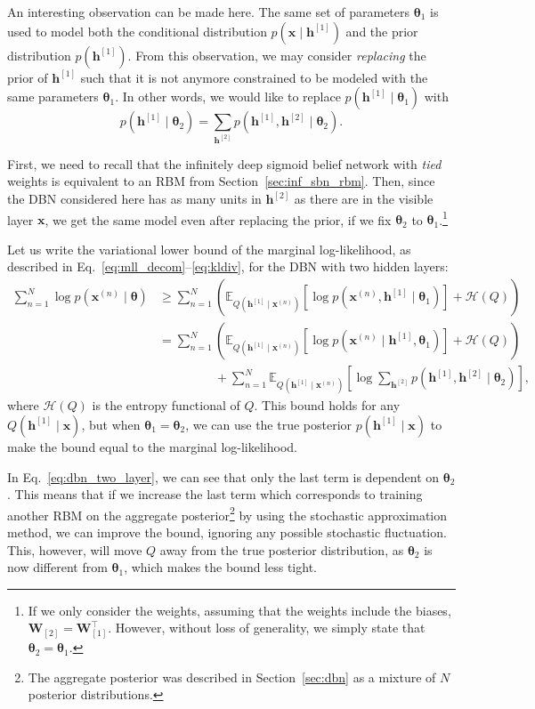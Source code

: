 \documentclass{now}
\newcommand{\qlay}[1]{\left[#1\right]}
\newcommand{\vect}[1]{\mathbf{#1}}
\newcommand{\vects}[1]{\boldsymbol{#1}}
\newcommand{\matr}[1]{\mathbf{#1}}
\newcommand{\vh}[0]{\vect{h}}
\newcommand{\vx}[0]{\vect{x}}
\newcommand{\mW}[0]{\matr{W}}
\newcommand{\TT}[0]{{\vects{\theta}}}
\newcommand{\HH}[0]{\mathcal{H}}
\newcommand{\E}[0]{\mathbb{E}}
\begin{document}
An interesting observation can be made here.  The same set
of parameters $\TT_1$ is used to model both the
conditional distribution $p(\vx \mid \vh^{\qlay{1}})$ and the
prior distribution $p(\vh^{\qlay{1}})$. From this observation, 
we may consider \textit{replacing} the prior of
$\vh^{\qlay{1}}$ such that it is not anymore constrained to be
modeled with the same parameters $\TT_1$.
In other words, we would like to replace
$p(\vh^{\qlay{1}} \mid \TT_1)$ with
\[
p(\vh^{\qlay{1}} \mid \TT_2) = \sum_{\vh^{\qlay{2}}}
p(\vh^{\qlay{1}},
\vh^{\qlay{2}} \mid \TT_2).
\]

First, we need to recall that the infinitely deep sigmoid
belief network with \textit{tied} weights is equivalent to
an RBM from Section~\ref{sec:inf_sbn_rbm}. Then, since the DBN
considered here has as many units in $\vh^{\qlay{2}}$ as there
are in the visible layer $\vx$, we get the same model even
after replacing the prior, if we fix $\TT_2$ to
$\TT_1$.\footnote{ If we only consider the weights, assuming
that the weights include the biases,
$\mW_{\qlay{2}}=\mW_{\qlay{1}}^\top$.
However, without loss of generality, we simply state that
$\TT_2=\TT_1$.  }

Let us write the variational lower bound of the marginal
log-likelihood, as described in
Eq.~\eqref{eq:mll_decom}--\eqref{eq:kldiv}, for the DBN with
two hidden layers:
\begin{align}
    \label{eq:dbn_two_layer}
    \sum_{n=1}^N \log p(\vx^{(n)} \mid \TT) &\geq
    \sum_{n=1}^N \left(\E_{Q(\vh^{\qlay{1}} \mid \vx^{(n)})} \left[
    \log p(\vx^{(n)}, \vh^{\qlay{1}} \mid \TT_1)
    \right] + \HH(Q)\right) 
    \nonumber \\
    &= \sum_{n=1}^N \left(\E_{Q(\vh^{\qlay{1}} \mid \vx^{(n)})} \left[
    \log p(\vx^{(n)} \mid \vh^{\qlay{1}}, \TT_1) \right] +
    \HH(Q)\right)
    \nonumber \\
    &\phantom{= \sum_{n=1}^N} + \sum_{n=1}^N
    \E_{Q(\vh^{\qlay{1}} \mid \vx^{(n)})} \left[ \log
    \sum_{\vh^{\qlay{2}}} p(\vh^{\qlay{1}}, \vh^{\qlay{2}} \mid \TT_2) \right]
    ,
\end{align}
where $\HH(Q)$ is the entropy functional of $Q$. This bound
holds for any $Q(\vh^{\qlay{1}} \mid \vx)$, but when $\TT_1 =
\TT_2$, we can use the true posterior $p(\vh^{\qlay{1}} \mid
\vx)$ to make the bound equal to the marginal
log-likelihood.

In Eq.~\eqref{eq:dbn_two_layer}, we can see that only the
last term is dependent on $\TT_2$. This means that if we
increase the last term which corresponds to training another
RBM on the aggregate posterior\footnote{The aggregate
posterior was described in Section~\ref{sec:dbn} as a
mixture of $N$ posterior distributions.} by using the
stochastic approximation method, we can improve the bound,
ignoring any possible stochastic fluctuation. 
This, however, will move $Q$ away from the true posterior
distribution, as $\TT_2$ is now different from $\TT_1$,
which makes the bound less tight.
\end{document}
